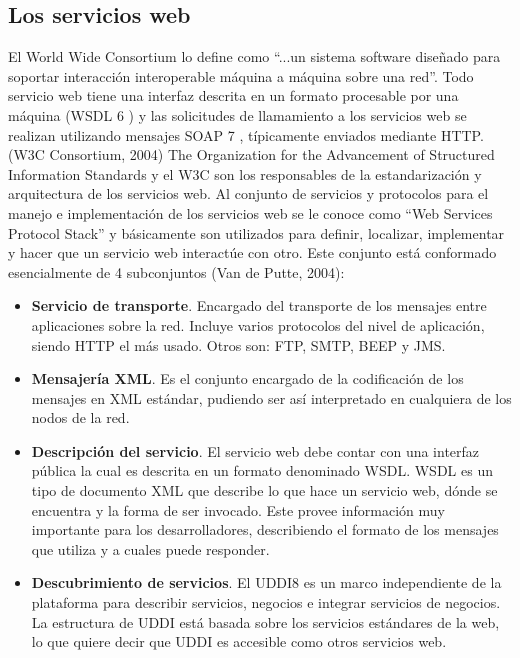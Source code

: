   \subsection{Los servicios web}
El World Wide Consortium lo define como “...un sistema software diseñado para
soportar interacción interoperable máquina a máquina sobre una red”.
Todo servicio web tiene una interfaz descrita en un formato procesable por una
máquina (WSDL 6 ) y las solicitudes de llamamiento a los servicios web se 
realizan utilizando mensajes SOAP 7 , típicamente enviados mediante HTTP. (W3C 
Consortium, 2004)
The Organization for the Advancement of Structured Information Standards y el
W3C son los responsables de la estandarización y arquitectura de los servicios 
web.
Al conjunto de servicios y protocolos para el manejo e implementación de los
servicios web se le conoce como “Web Services Protocol Stack” y básicamente son
utilizados para definir, localizar, implementar y hacer que un servicio web 
interactúe con otro. Este conjunto está conformado esencialmente de 4 
subconjuntos (Van de Putte, 2004):
\begin{itemize}
\item \textbf{Servicio de transporte}. Encargado del transporte de los 
mensajes entre aplicaciones sobre la red. Incluye varios protocolos del nivel 
de aplicación, siendo HTTP el más usado. Otros son: FTP, SMTP, BEEP y JMS.
\item \textbf{Mensajería XML}. Es el conjunto encargado de la codificación de 
los mensajes en XML estándar, pudiendo ser así interpretado en cualquiera de
los nodos de la red.
\item \textbf{Descripción del servicio}. El servicio web debe contar con una 
interfaz pública la cual es descrita en un formato denominado WSDL. WSDL es un
tipo de documento XML que describe lo que hace un servicio web, dónde se
encuentra y la forma de ser invocado. Este provee información muy
importante para los desarrolladores, describiendo el formato de los mensajes
que utiliza y a cuales puede responder.
\item \textbf{Descubrimiento de servicios}. El UDDI8 es un marco independiente 
de la plataforma para describir servicios, negocios e integrar servicios de
negocios. La estructura de UDDI está basada sobre los servicios estándares
de la web, lo que quiere decir que UDDI es accesible como otros servicios
web.
\end{itemize}

